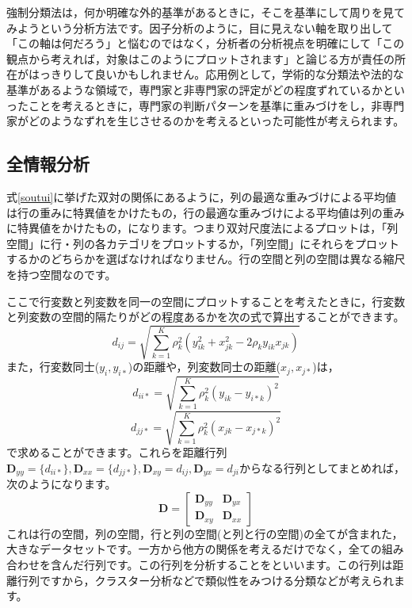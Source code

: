\documentclass{ltjsbook}
\begin{document}
強制分類法は，何か明確な外的基準があるときに，そこを基準にして周りを見てみようという分析方法です。因子分析のように，目に見えない軸を取り出して「この軸は何だろう」と悩むのではなく，分析者の分析視点を明確にして「この観点から考えれば，対象はこのようにプロットされます」と論じる方が責任の所在がはっきりして良いかもしれません。応用例として，学術的な分類法や法的な基準があるような領域で，専門家と非専門家の評定がどの程度ずれているかといったことを考えるときに，専門家の判断パターンを基準に重みづけをし，非専門家がどのようなずれを生じさせるのかを考えるといった可能性が考えられます。

\subsection{全情報分析}
式\ref{soutui}に挙げた双対の関係にあるように，列の最適な重みづけによる平均値は行の重みに特異値をかけたもの，行の最適な重みづけによる平均値は列の重みに特異値をかけたもの，になります。つまり双対尺度法によるプロットは，「列空間」に行・列の各カテゴリをプロットするか，「列空間」にそれらをプロットするかのどちらかを選ばなければなりません。行の空間と列の空間は異なる縮尺を持つ空間なのです。

ここで行変数と列変数を同一の空間にプロットすることを考えたときに，行変数と列変数の空間的隔たりがどの程度あるかを次の式で算出することができます。
$$ d_{ij} = \sqrt{\sum_{k=1}^K \rho_k^2(y_{ik}^2+x_{jk}^2-2\rho_ky_{ik}x_{jk})} $$
また，行変数同士($y_i,y_{i*}$)の距離や，列変数同士の距離($x_j,x_{j*}$)は，
$$ d_{ii*} = \sqrt{\sum_{k=1}^K \rho_k^2(y_{ik}-y_{i*k})^2}$$
$$ d_{jj*} = \sqrt{\sum_{k=1}^K \rho_k^2(x_{jk}-x_{j*k})^2}$$
で求めることができます。これらを距離行列$\bm{D}_{yy} = \{ d_{ii*} \},\bm{D}_{xx} = \{ d_{jj*} \}, \bm{D}_{xy} = d_{ij}, \bm{D}_{yx} = d_{ji} $からなる行列としてまとめれば，次のようになります。
\begin{equation}
    \bm{D} =
    \begin{bmatrix}
        \bm{D}_{yy} & \bm{D}_{yx} \\
        \bm{D}_{xy} & \bm{D}_{xx}
    \end{bmatrix}
\end{equation}
これは行の空間，列の空間，行と列の空間(と列と行の空間)の全てが含まれた，大きなデータセットです。一方から他方の関係を考えるだけでなく，全ての組み合わせを含んだ行列です。この行列を分析することをといいます。この行列は距離行列ですから，クラスター分析などで類似性をみつける分類などが考えられます。
\end{document}
